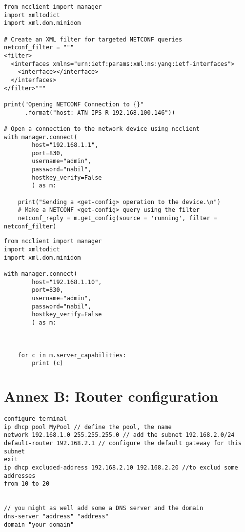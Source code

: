 \begin{lstlisting}[style=pythonStyle, caption={Get-config.}, backgroundcolor=\color{codebackground}]
from ncclient import manager
import xmltodict
import xml.dom.minidom

# Create an XML filter for targeted NETCONF queries
netconf_filter = """
<filter>
  <interfaces xmlns="urn:ietf:params:xml:ns:yang:ietf-interfaces">
    <interface></interface>
  </interfaces>
</filter>"""

print("Opening NETCONF Connection to {}"
      .format("host: ATN-IPS-R-192.168.100.146"))

# Open a connection to the network device using ncclient
with manager.connect(
        host="192.168.1.1",
        port=830,
        username="admin", 
        password="nabil",
        hostkey_verify=False
        ) as m:

    print("Sending a <get-config> operation to the device.\n")
    # Make a NETCONF <get-config> query using the filter
    netconf_reply = m.get_config(source = 'running', filter = netconf_filter)          
\end{lstlisting}
\begin{lstlisting}[style=pythonStyle, caption={Get-capabilities.}, backgroundcolor=\color{codebackground}]
from ncclient import manager
import xmltodict
import xml.dom.minidom

with manager.connect(
        host="192.168.1.10",
        port=830,
        username="admin",
        password="nabil",
        hostkey_verify=False
        ) as m:


        
    for c in m.server_capabilities:
        print (c)         
\end{lstlisting}


\section{Annex B: Router configuration}

\begin{lstlisting}[style=cliStyle, caption={Configure DHCP.},  backgroundcolor=\color{codebackground}]
configure terminal
ip dhcp pool MyPool // define the pool, the name 
network 192.168.1.0 255.255.255.0 // add the subnet 192.168.2.0/24
default-router 192.168.2.1 // configure the default gateway for this subnet 
exit 
ip dhcp excluded-address 192.168.2.10 192.168.2.20 //to exclud some addresses 
from 10 to 20


// you might as well add some a DNS server and the domain 
dns-server "address" "address"
domain "your domain"
\end{lstlisting}

